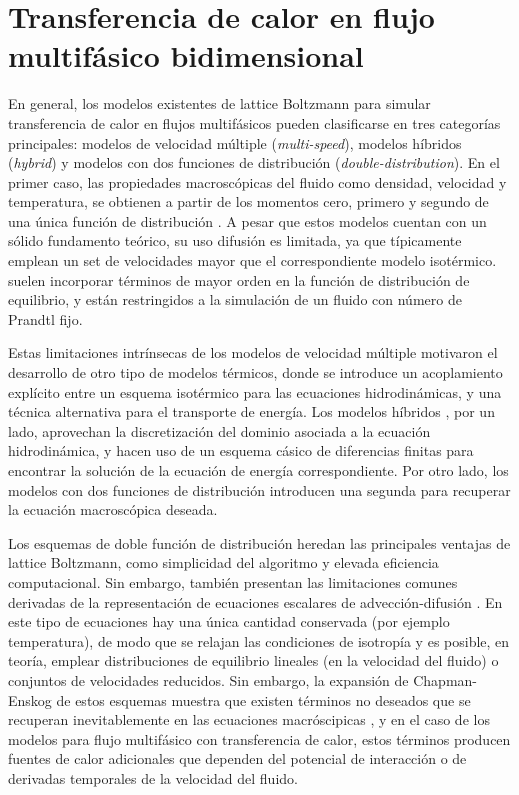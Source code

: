 \chapter{Transferencia de calor en flujo multif\'asico bidimensional}

En general, los modelos existentes de lattice Boltzmann para simular transferencia de calor en flujos multif\'asicos pueden clasificarse en tres categor\'ias principales: modelos de velocidad m\'ultiple (\emph{multi-speed}), modelos h\'ibridos (\emph{hybrid}) y modelos con dos funciones de distribuci\'on (\emph{double-distribution}). En el primer caso, las propiedades macrosc\'opicas del fluido como densidad, velocidad y temperatura, se obtienen a partir de los momentos cero, primero y segundo de una \'unica funci\'on de distribuci\'on \cite{alexander_lattice_1993,succi_lattice_2018}. A pesar que estos modelos cuentan con un s\'olido fundamento te\'orico, su uso difusi\'on es limitada, ya que t\'ipicamente emplean un set de velocidades mayor que el correspondiente modelo isot\'ermico. suelen incorporar t\'erminos de mayor orden en la funci\'on de distribuci\'on de equilibrio, y est\'an restringidos a la simulaci\'on de un fluido con n\'umero de Prandtl fijo.

Estas limitaciones intr\'insecas de los modelos de velocidad m\'ultiple motivaron el desarrollo de otro tipo de modelos t\'ermicos, donde se introduce un acoplamiento expl\'icito entre un esquema isot\'ermico para las ecuaciones hidrodin\'amicas, y una t\'ecnica alternativa para el transporte de energ\'ia. Los modelos h\'ibridos \cite{dong_numerical_2012,li_lattice_2015}, por un lado, aprovechan la discretizaci\'on del dominio asociada a la ecuaci\'on hidrodin\'amica, y hacen uso de un esquema c\'asico de diferencias finitas para encontrar la soluci\'on de la ecuaci\'on de energ\'ia correspondiente. Por otro lado, los modelos con dos funciones de distribuci\'on introducen una segunda \lbe{} para recuperar la ecuaci\'on macrosc\'opica deseada.

Los esquemas de doble funci\'on de distribuci\'on heredan las principales ventajas de lattice Boltzmann, como simplicidad del algoritmo y elevada eficiencia computacional. Sin embargo, tambi\'en presentan las limitaciones comunes derivadas de la representaci\'on de ecuaciones escalares de advecci\'on-difusi\'on \cite{markus_simulation_2011, huang_modified_2014, li_improved_2017, huang_numerical_2011, li_effect_2014, huang_multiphase_2015}. En este tipo de ecuaciones hay una \'unica cantidad conservada (por ejemplo temperatura), de modo que se relajan las condiciones de isotrop\'ia y es posible, en teor\'ia, emplear distribuciones de equilibrio lineales (en la velocidad del fluido) o conjuntos de velocidades reducidos. Sin embargo, la expansi\'on de Chapman-Enskog de estos esquemas muestra que existen t\'erminos no deseados que se recuperan inevitablemente en las ecuaciones macr\'oscipicas \cite{huang_modified_2014, huang_numerical_2011, kruger_lattice_2017}, y en el caso de los modelos para flujo multif\'asico con transferencia de calor, estos t\'erminos producen fuentes de calor adicionales que dependen del potencial de interacci\'on o de derivadas temporales de la velocidad del fluido.

